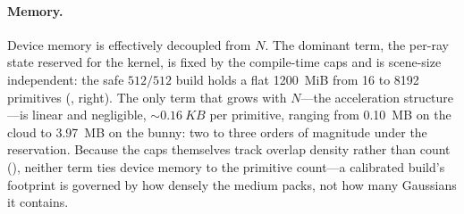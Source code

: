 \paragraph{Memory.} Device memory is effectively decoupled from \(N\). The dominant term, the per-ray
state reserved for the kernel, is fixed by the compile-time caps and is scene-size independent: the
safe \(512/512\) build holds a flat \SI{1200}{MiB} from \num{16} to \num{8192} primitives
(, right). The only term that grows with \(N\)---the acceleration structure---is
linear and negligible, \(\sim\!\SI{0.16}{KB}\) per primitive, ranging from \SI{0.10}{MB} on the cloud to
\SI{3.97}{MB} on the bunny: two to three orders of magnitude under the reservation. Because the caps
themselves track overlap density rather than count (), neither term ties device memory
to the primitive count---a calibrated build's footprint is governed by how densely the medium packs, not
how many Gaussians it contains.
